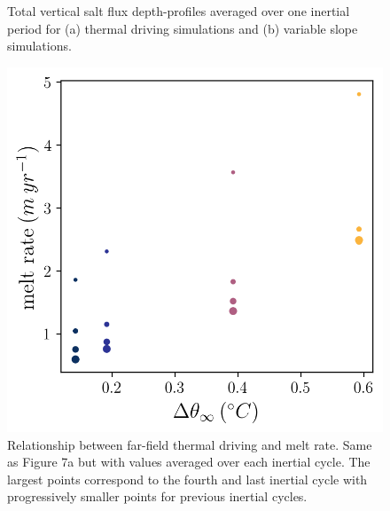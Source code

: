 \documentclass[draft,jgrga]{agutexSI2019}
\begin{document}
\begin{figure}[]
\begin{minipage}{0.5\textwidth}
    \end{minipage}
    \caption{Total vertical salt flux depth-profiles averaged over one inertial period for (a) thermal driving simulations and (b) variable slope simulations.}
    \label{fig:saltflux}
\end{figure}%

\begin{figure}
    \centering
    \includegraphics{Figures/melt_dT_cmp_dT_43h_tav13h_cycles.png}
    \caption{Relationship between far-field thermal driving and melt rate. Same as Figure 7a but with values averaged over each inertial cycle. The largest points correspond to the fourth and last inertial cycle with progressively smaller points for previous inertial cycles. }
    \label{fig:melt_sensitivity_cycles}
\end{figure}%
%
%
%
%
\end{document}
